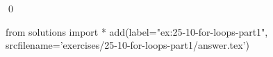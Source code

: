 
\begin{ex}
  \label{ex:25-10-for-loops-part1}
  
  \qed
\end{ex}
\begin{python0}
from solutions import *
add(label="ex:25-10-for-loops-part1",
    srcfilename='exercises/25-10-for-loops-part1/answer.tex')
\end{python0}
